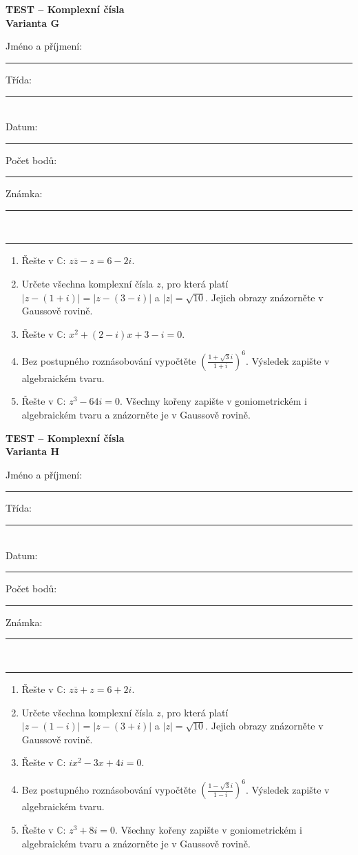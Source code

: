 \documentclass[a4paper,11pt]{article}
\newcommand{\TestTitle}{Komplexní čísla}
\newcommand{\TestHeader}[1]{%
    \begin{center}
        {\Large\bfseries TEST -- \TestTitle}\\[2mm]
        {\bfseries Varianta #1}
    \end{center}
    \vspace{2mm}
    Jméno a příjmení: \rule{9cm}{0.4pt}\hfill Třída: \rule{2cm}{0.4pt}\\[3mm]
    Datum: \rule{3cm}{0.4pt}\hfill Počet bodů: \rule{2cm}{0.4pt}\hfill Známka: \rule{2cm}{0.4pt}\\[2mm]
    \hrule\vspace{4mm}
}
\newcommand{\AnswerSpace}[1]{\vspace{#1}}
\begin{document}
\TestHeader{G}

\begin{enumerate}
    \item Řešte v $\mathbb C$: $z\overline z-z=6-2i$.
    \AnswerSpace{20mm}
    \item Určete všechna komplexní čísla $z$, pro která platí
    $|z-(1+i)|=|z-(3-i)|$ a $|z|=\sqrt{10}$.
    Jejich obrazy znázorněte v Gaussově rovině.
    \AnswerSpace{38mm}
    \item Řešte v $\mathbb C$: $x^2+(2-i)x+3-i=0$.
    \AnswerSpace{23mm}
    \item Bez postupného roznásobování vypočtěte
    $\displaystyle\left(\frac{1+\sqrt3i}{1+i}\right)^6$.
    Výsledek zapište v algebraickém tvaru.
    \AnswerSpace{26mm}
    \item Řešte v $\mathbb C$: $z^3-64i=0$.
    Všechny kořeny zapište v goniometrickém i algebraickém tvaru
    a znázorněte je v Gaussově rovině.
    \AnswerSpace{44mm}
\end{enumerate}

\newpage
\TestHeader{H}

\begin{enumerate}
    \item Řešte v $\mathbb C$: $z\overline z+z=6+2i$.
    \AnswerSpace{20mm}
    \item Určete všechna komplexní čísla $z$, pro která platí
    $|z-(1-i)|=|z-(3+i)|$ a $|z|=\sqrt{10}$.
    Jejich obrazy znázorněte v Gaussově rovině.
    \AnswerSpace{38mm}
    \item Řešte v $\mathbb C$: $ix^2-3x+4i=0$.
    \AnswerSpace{23mm}
    \item Bez postupného roznásobování vypočtěte
    $\displaystyle\left(\frac{1-\sqrt3i}{1-i}\right)^6$.
    Výsledek zapište v algebraickém tvaru.
    \AnswerSpace{26mm}
    \item Řešte v $\mathbb C$: $z^3+8i=0$.
    Všechny kořeny zapište v goniometrickém i algebraickém tvaru
    a znázorněte je v Gaussově rovině.
    \AnswerSpace{44mm}
\end{enumerate}
\end{document}
